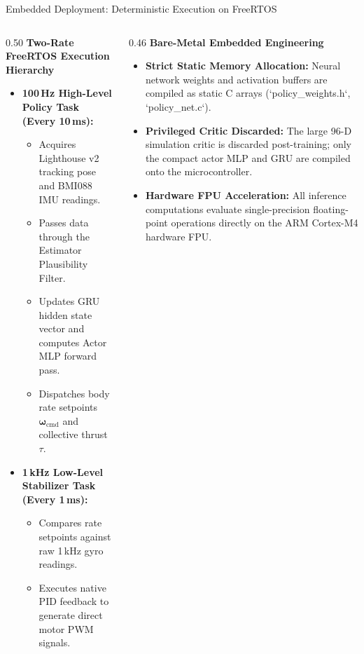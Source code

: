 \documentclass[aspectratio=169,9pt]{beamer}
\begin{document}
\begin{frame}{Embedded Deployment: Deterministic Execution on FreeRTOS}
  \begin{columns}[onlytextwidth,T]
    \begin{column}{0.50\textwidth}
      \textbf{Two-Rate FreeRTOS Execution Hierarchy}
      \begin{itemize}\itemsep3pt
        \item \textbf{100\,Hz High-Level Policy Task (Every 10\,ms):}
        \begin{itemize}\itemsep1pt
          \item Acquires Lighthouse v2 tracking pose and BMI088 IMU readings.
          \item Passes data through the Estimator Plausibility Filter.
          \item Updates GRU hidden state vector and computes Actor MLP forward pass.
          \item Dispatches body rate setpoints $\boldsymbol{\omega}_{\text{cmd}}$ and collective thrust $\tau$.
        \end{itemize}
        \item \textbf{1\,kHz Low-Level Stabilizer Task (Every 1\,ms):}
        \begin{itemize}\itemsep1pt
          \item Compares rate setpoints against raw 1\,kHz gyro readings.
          \item Executes native PID feedback to generate direct motor PWM signals.
        \end{itemize}
      \end{itemize}
    \end{column}
    
    \begin{column}{0.46\textwidth}
      \textbf{Bare-Metal Embedded Engineering}
      \begin{itemize}\itemsep3pt
        \item \textbf{Strict Static Memory Allocation:}
        Neural network weights and activation buffers are compiled as static C arrays (`policy\_weights.h`, `policy\_net.c`).
        \item \textbf{Privileged Critic Discarded:}
        The large 96-D simulation critic is discarded post-training; only the compact actor MLP and GRU are compiled onto the microcontroller.
        \item \textbf{Hardware FPU Acceleration:}
        All inference computations evaluate single-precision floating-point operations directly on the ARM Cortex-M4 hardware FPU.
      \end{itemize}
    \end{column}
  \end{columns}
\end{frame}
\end{document}
